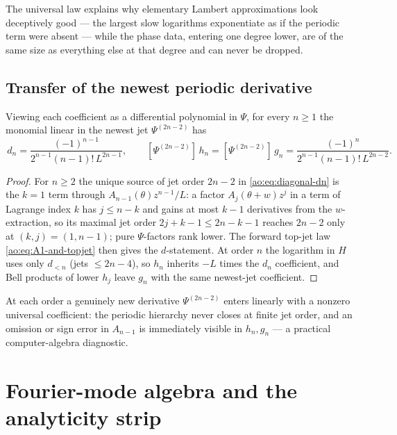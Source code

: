 The universal law explains why elementary Lambert approximations look
deceptively good --- the largest slow logarithms exponentiate as if
the periodic term were absent --- while the phase data, entering one
degree lower, are of the same size as everything else at that degree
and can never be dropped.

\subsection{Transfer of the newest periodic derivative}

\begin{theorem}
\label{ao:thm:inverse-topjet}
Viewing each coefficient as a differential polynomial in $\Psi$, for
every $n\ge1$ the monomial linear in the newest jet
$\Psi^{(2n-2)}$ has
\begin{equation}
 [\Psi^{(2n-2)}]\,d_n
 =\frac{(-1)^{n-1}}{2^{n-1}(n-1)!\,L^{2n-1}},
 \qquad
 [\Psi^{(2n-2)}]\,h_n
 =[\Psi^{(2n-2)}]\,g_n
 =\frac{(-1)^{n}}{2^{n-1}(n-1)!\,L^{2n-2}}.
 \label{ao:eq:inverse-topjet}
\end{equation}
\end{theorem}

\begin{proof}
For $n\ge2$ the unique source of jet order $2n-2$ in
\eqref{ao:eq:diagonal-dn} is the $k=1$ term through
$A_{n-1}(\theta)z^{n-1}/L$: a factor $A_j(\theta+w)z^{j}$ in a term
of Lagrange index $k$ has $j\le n-k$ and gains at most $k-1$
derivatives from the $w$-extraction, so its maximal jet order
$2j+k-1\le2n-k-1$ reaches $2n-2$ only at $(k,j)=(1,n-1)$; pure
$\Psi$-factors rank lower.  The forward top-jet law
\eqref{ao:eq:A1-and-topjet} then gives the $d$-statement.  At order $n$
the logarithm in $H$ uses only $d_{<n}$ (jets $\le2n-4$), so
$h_n$ inherits $-L$ times the $d_n$ coefficient, and Bell products of
lower $h_j$ leave $g_n$ with the same newest-jet coefficient.
\end{proof}

At each order a genuinely new derivative $\Psi^{(2n-2)}$ enters
linearly with a nonzero universal coefficient: the periodic hierarchy
never closes at finite jet order, and an omission or sign error in
$A_{n-1}$ is immediately visible in $h_n,g_n$ --- a practical
computer-algebra diagnostic.

\section{Fourier-mode algebra and the analyticity strip}
\label{ao:sec:fourier}

